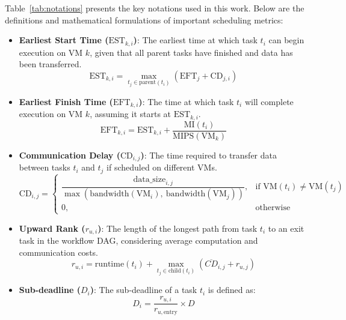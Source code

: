 \documentclass[12pt]{tcc}
\begin{document}
Table~\ref{tab:notations} presents the key notations used in this work. Below are the definitions and mathematical formulations of important scheduling metrics:
\begin{itemize}

    \item \textbf{Earliest Start Time (\( \text{EST}_{k,i} \))}:
    The earliest time at which task \( t_i \) can begin execution on VM \( k \), given that all parent tasks have finished and data has been transferred.  
    \begin{equation}
    \text{EST}_{k,i} = \max_{t_j \in \text{parent}(t_i)} \left( \text{EFT}_{j} + \text{CD}_{j,i} \right)
    \end{equation}

    \item \textbf{Earliest Finish Time (\( \text{EFT}_{k,i} \))}:  
    The time at which task \( t_i \) will complete execution on VM \( k \), assuming it starts at \( \text{EST}_{k,i} \).  
    \begin{equation}
    \text{EFT}_{k,i} = \text{EST}_{k,i} + \frac{\text{MI}(t_i)}{\text{MIPS}(\text{VM}_k)}
    \end{equation}

    \item \textbf{Communication Delay (\( \text{CD}_{i,j} \))}:  
    The time required to transfer data between tasks \( t_i \) and \( t_j \) if scheduled on different VMs.  
    \begin{equation}
    \text{CD}_{i,j} =
    \begin{cases}
    \dfrac{\text{data\_size}_{i,j}}{\max(\text{bandwidth}(\text{VM}_i),\ \text{bandwidth}(\text{VM}_j))}, & \text{if } \text{VM}(t_i) \neq \text{VM}(t_j) \\
    0, & \text{otherwise}
    \end{cases}
    \end{equation}

    \item \textbf{Upward Rank (\( r_{u,i} \))}:  
    The length of the longest path from task \( t_i \) to an exit task in the workflow DAG, considering average computation and communication costs.  
    \begin{equation}
    r_{u,i} = \text{runtime}(t_i) + \max_{t_j \in \text{child}(t_i)} \left( \overline{CD}_{i,j} + r_{u,j} \right)
    \end{equation}

    \item \textbf{Sub-deadline (\( D_i \))}:  
    The sub-deadline of a task \( t_i \) is defined as:
    \begin{equation}
    D_i = \frac{r_{u,i}}{r_{u,\text{entry}}} \times D
    \end{equation}


\end{itemize}
\end{document}
